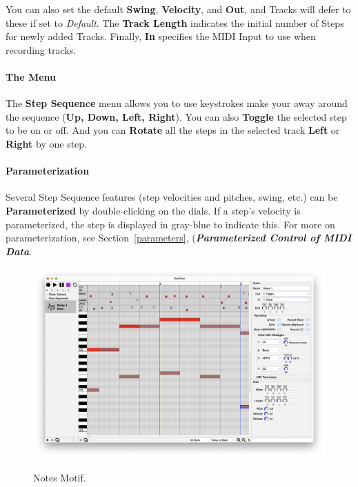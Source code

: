 \documentclass[twoside,10pt]{article}
\newcommand\ignore[1]{}
\begin{document}
You can also set the default {\bf Swing}, {\bf Velocity}, and {\bf Out}, and Tracks will defer to these if set to {\it Default}.  The {\bf Track Length} indicates the initial number of Steps for newly added Tracks. Finally, {\bf In} specifies the MIDI Input to use when recording tracks.

\paragraph{The Menu}

The {\bf Step Sequence} menu allows you to use keystrokes make your away around the sequence ({\bf Up, Down, Left, Right}).  You can also {\bf Toggle} the selected step to be on or off.  And you can {\bf Rotate} all the steps in the selected track {\bf Left} or {\bf Right} by one step.

\ignore{
\paragraph{Recording a Step Sequence}

If you arm one or more Tracks, set their Notes, and set the Sequence's MIDI Input accordingly, then you can record in Notes to those tracks when you press Record on Seq.   You will find this easier if you turn on the metronome and if you set the Step Sequence to be the Root, so it records immediately.  Remember that if your Step Sequence motif is not a descendant of the Root, it will never be reached to do Recording.
}

\paragraph{Parameterization}

Several Step Sequence features (step velocities and pitches, swing, etc.) can be {\bf Parameterized} by double-clicking on the dials.  If a step's velocity is parameterized, the step is displayed in gray-blue to indicate this.  For more on parameterization, see Section~\ref{parameters}, (\textbf{\textit{Parameterized Control of MIDI Data}}.


\clearpage

\begin{figure}[t]
\centering
\includegraphics[alt={yo},width=6.5in]{Notes}
\vspace{-2em}
\caption{Notes Motif.}
\label{notes}
\end{figure}
\end{document}
